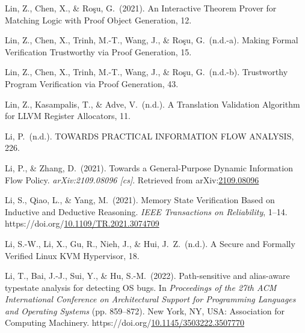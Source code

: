 \documentclass[12pt,twoside]{article}
\begin{document}
{\begin{thebibliography}{1079}
\mdbibitemlabel{}Lin, Z., Chen, X., \& Roşu, G.~(2021). An Interactive Theorem Prover for Matching Logic with Proof Object Generation, 12.%

\mdbibitemlabel{}Lin, Z., Chen, X., Trinh, M.-T., Wang, J., \& Roşu, G.~(n.d.-a). Making Formal Verification Trustworthy via Proof Generation, 15.%

\mdbibitemlabel{}Lin, Z., Chen, X., Trinh, M.-T., Wang, J., \& Roşu, G.~(n.d.-b). Trustworthy Program Veriﬁcation via Proof Generation, 43.%

\mdbibitemlabel{}Lin, Z., Kasampalis, T., \& Adve, V.~(n.d.). A Translation Validation Algorithm for LLVM Register Allocators, 11.%

\mdbibitemlabel{}Li, P.~(n.d.). TOWARDS PRACTICAL INFORMATION FLOW ANALYSIS, 226.%

\mdbibitemlabel{}Li, P., \& Zhang, D.~(2021). Towards a General-Purpose Dynamic Information Flow Policy. \emph{arXiv:2109.08096 {}[cs]}. Retrieved from arXiv:\href{http://arxiv.org/abs/2109.08096}{2109.08096}%

\mdbibitemlabel{}Li, S., Qiao, L., \& Yang, M.~(2021). Memory State Verification Based on Inductive and Deductive Reasoning. \emph{IEEE Transactions on Reliability}, 1–14. https://doi.org/\href{https://dx.doi.org/10.1109/TR.2021.3074709}{10.1109/TR.2021.3074709}%

\mdbibitemlabel{}Li, S.-W., Li, X., Gu, R., Nieh, J., \& Hui, J.~Z.~(n.d.). A Secure and Formally Verified Linux KVM Hypervisor, 18.%

\mdbibitemlabel{}Li, T., Bai, J.-J., Sui, Y., \& Hu, S.-M.~(2022). Path-sensitive and alias-aware typestate analysis for detecting OS bugs. In \emph{Proceedings of the 27th ACM International Conference on Architectural Support for Programming Languages and Operating Systems} (pp. 859–872). New York, NY, USA: Association for Computing Machinery. https://doi.org/\href{https://dx.doi.org/10.1145/3503222.3507770}{10.1145/3503222.3507770}%


\end{thebibliography}}
\end{document}
